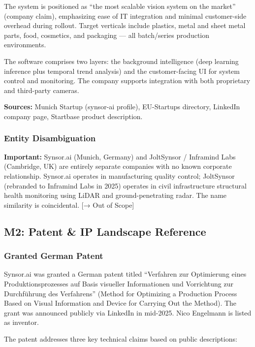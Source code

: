 \documentclass[11pt,letterpaper]{article}
\begin{document}
The system is positioned as ``the most scalable vision system on the market'' (company claim), emphasizing ease of IT integration and minimal customer-side overhead during rollout. Target verticals include plastics, metal and sheet metal parts, food, cosmetics, and packaging --- all batch/series production environments.

The software comprises two layers: the background intelligence (deep learning inference plus temporal trend analysis) and the customer-facing UI for system control and monitoring. The company supports integration with both proprietary and third-party cameras.

\textbf{Sources:} Munich Startup (synsor-ai profile), EU-Startups directory, LinkedIn company page, Startbase product description.

\subsubsection{Entity Disambiguation}

\begin{quotebox}
\textbf{Important:} Synsor.ai (Munich, Germany) and JoltSynsor / Inframind Labs (Cambridge, UK) are entirely separate companies with no known corporate relationship. Synsor.ai operates in manufacturing quality control; JoltSynsor (rebranded to Inframind Labs in 2025) operates in civil infrastructure structural health monitoring using LiDAR and ground-penetrating radar. The name similarity is coincidental. [→ Out of Scope]
\end{quotebox}

\subsection{M2: Patent \& IP Landscape Reference}

\subsubsection{Granted German Patent}

Synsor.ai was granted a German patent titled ``Verfahren zur Optimierung eines Produktionsprozesses auf Basis visueller Informationen und Vorrichtung zur Durchf\"{u}hrung des Verfahrens'' (Method for Optimizing a Production Process Based on Visual Information and Device for Carrying Out the Method). The grant was announced publicly via LinkedIn in mid-2025. Nico Engelmann is listed as inventor.

The patent addresses three key technical claims based on public descriptions:
\end{document}
